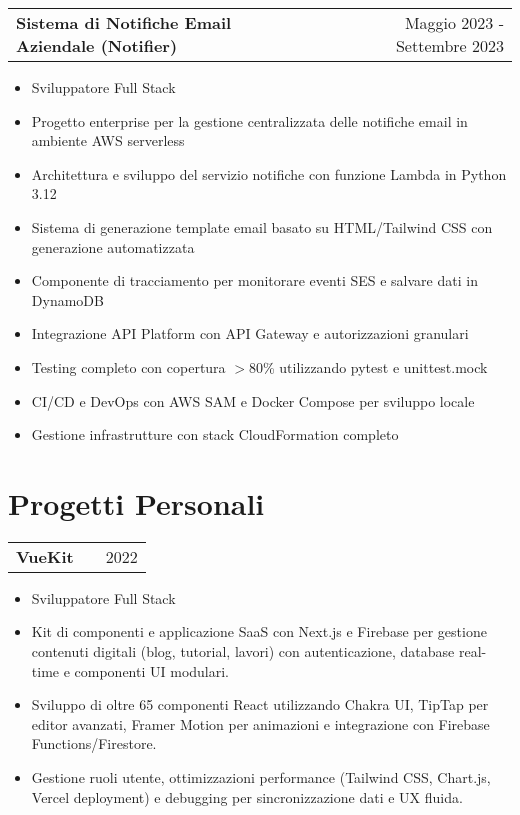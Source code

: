 \documentclass[a4paper,12pt]{article}
\makeatletter
\newenvironment{joblong}[2]
    {
    \begin{tabularx}{\linewidth}{@{}l X r@{}}
    \textbf{#1} & \hfill &  #2 \\[3.75pt]
    \end{tabularx}
    \begin{minipage}[t]{\linewidth}
    \begin{itemize}[nosep,after=\strut, leftmargin=1em, itemsep=3pt,label=--]
    }
    {
    \end{itemize}
    \end{minipage}    
    }
\makeatother
\begin{document}
\begin{joblong}{Sistema di Notifiche Email Aziendale (Notifier)}{Maggio 2023 - Settembre 2023}
\item Sviluppatore Full Stack
\item Progetto enterprise per la gestione centralizzata delle notifiche email in ambiente AWS serverless
\item Architettura e sviluppo del servizio notifiche con funzione Lambda in Python 3.12
\item Sistema di generazione template email basato su HTML/Tailwind CSS con generazione automatizzata
\item Componente di tracciamento per monitorare eventi SES e salvare dati in DynamoDB
\item Integrazione API Platform con API Gateway e autorizzazioni granulari
\item Testing completo con copertura $>$80\% utilizzando pytest e unittest.mock
\item CI/CD e DevOps con AWS SAM e Docker Compose per sviluppo locale
\item Gestione infrastrutture con stack CloudFormation completo
\end{joblong}

\section{Progetti Personali}

\begin{joblong}{VueKit}{2022}
\item Sviluppatore Full Stack
\item Kit di componenti e applicazione SaaS con Next.js e Firebase per gestione contenuti digitali (blog, tutorial, lavori) con autenticazione, database real-time e componenti UI modulari.
\item Sviluppo di oltre 65 componenti React utilizzando Chakra UI, TipTap per editor avanzati, Framer Motion per animazioni e integrazione con Firebase Functions/Firestore.
\item Gestione ruoli utente, ottimizzazioni performance (Tailwind CSS, Chart.js, Vercel deployment) e debugging per sincronizzazione dati e UX fluida.
\end{joblong}

\end{document}
